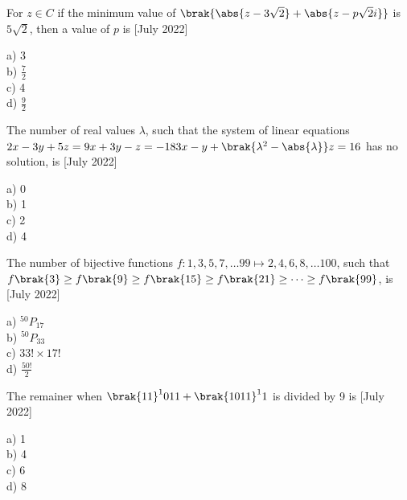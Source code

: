 \iffalse
\title{July 2022, shift 2}
\author{EE24BTECH11062}	
\section{mcq-single}
\fi
   
\item For $z\in C$ if the minimum value of $\brak{\abs{z-3\sqrt{2}}+\abs{z-p\sqrt{2}i}}$ is $5\sqrt{2}$, then a value of $p$ is \hfill{[July 2022]}
\begin{multicols}{4}
    a) 3\\
    b) $\frac{7}{2}$\\
    c) 4\\
    d) $\frac{9}{2}$
\end{multicols}
 \item The number of real values $\lambda$, such that the system of linear equations $2x-3y+5z=9\\ 
 x+3y-z=-18\\
 3x-y+\brak{\lambda^2 - \abs{\lambda}}z=16$ has no solution, is \hfill{[July 2022]}
 \begin{multicols}{4}
     a) 0\\
     b) 1\\
     c) 2\\
     d) 4
 \end{multicols}
 
 \item The number of bijective functions $f:{1,3,5,7,\dots 99}\mapsto {2,4,6,8,\dots 100}$, such that $f\brak{3}\geq f\brak{9}\geq f\brak{15}\geq f\brak{21}\geq \dots \geq f\brak{99}$, is \hfill{[July 2022]}
 \begin{multicols}{4}
    a) $^{50} P_{17}$\\
    b) $^{50} P_{33}$\\
    c) $33! \times 17!$\\
    d) $\frac{50!}{2}$
 \end{multicols}
 
\item The remainer when $\brak{11}^1011+\brak{1011}^11$ is divided by 9 is \hfill{[July 2022]}
\begin{multicols}{4}
    a) 1\\
    b) 4\\
    c) 6\\
    d) 8
\end{multicols}


